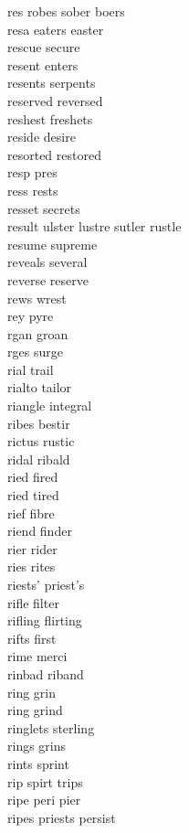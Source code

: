 res robes sober boers  \\
resa eaters easter  \\
rescue secure\\
resent enters\\
resents serpents \\
reserved reversed\\
reshest freshets \\
reside desire\\
resorted restored\\
resp pres\\
ress rests \\
resset secrets \\
result ulster lustre sutler rustle\\
resume supreme \\
reveals several\\
reverse reserve\\
rews wrest \\
rey pyre \\
rgan groan \\
rges surge \\
rial trail \\
rialto tailor\\
riangle integral \\
ribes bestir \\
rictus rustic\\
ridal ribald \\
ried fired \\
ried tired \\
rief fibre \\
riend finder \\
rier rider \\
ries rites \\
riests' priest's \\
rifle filter \\
rifling flirting \\
rifts first\\
rime merci \\
rinbad riband\\
ring grin\\
ring grind \\
ringlets sterling\\
rings grins\\
rints sprint \\
rip spirt trips  \\
ripe peri pier\\
ripes priests persist  \\

